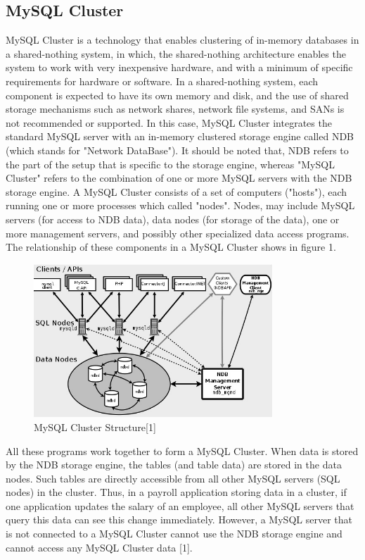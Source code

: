 \documentclass[10pt, conference]{IEEEtran}
\begin{document}
\subsection{MySQL Cluster}
\indent MySQL Cluster is a technology that enables clustering of in-memory databases in a shared-nothing system, in which, the shared-nothing architecture enables the system to work with very inexpensive hardware, and with a minimum of specific requirements for hardware or software. In a shared-nothing system, each component is expected to have its own memory and disk, and the use of shared storage mechanisms such as network shares, network file systems, and SANs is not recommended or supported. In this case, MySQL Cluster integrates the standard MySQL server with an in-memory clustered storage engine called NDB (which stands for "Network DataBase"). It should be noted that, NDB refers to the part of the setup that is specific to the storage engine, whereas "MySQL Cluster" refers to the combination of one or more MySQL servers with the NDB storage engine. A MySQL Cluster consists of a set of computers ("hosts"), each running one or more processes which called "nodes". Nodes, may include MySQL servers (for access to NDB data), data nodes (for storage of the data), one or more management servers, and possibly other specialized data access programs. The relationship of these components in a MySQL Cluster shows in figure 1. 

\begin{figure}[h!]
	\centering
	\includegraphics[width=9cm]{figure1.jpg}
	\caption{MySQL Cluster Structure[1]}
\end{figure} 
\indent All these programs work together to form a MySQL Cluster. When data is stored by the NDB storage engine, the tables (and table data) are stored in the data nodes. Such tables are directly accessible from all other MySQL servers (SQL nodes) in the cluster. Thus, in a payroll application storing data in a cluster, if one application updates the salary of an employee, all other MySQL servers that query this data can see this change immediately. However, a MySQL server that is not connected to a MySQL Cluster cannot use the NDB storage engine and cannot access any MySQL Cluster data [1].
\end{document}
